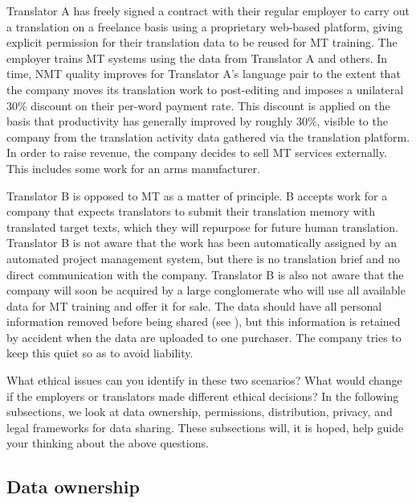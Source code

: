 \documentclass[output=paper]{langscibook}
\begin{document}
Translator A has freely signed a contract with their regular employer to carry out a translation on a freelance basis using a proprietary web-based platform, giving explicit permission for their translation data to be reused for MT training. The employer trains MT systems using the data from Translator A and others. In time, NMT quality improves for Translator A’s language pair to the extent that the company moves its translation work to post-editing and imposes a unilateral 30\% discount on their per-word payment rate. This discount is applied on the basis that productivity has generally improved by roughly 30\%, visible to the company from the translation activity data gathered via the translation platform. In order to raise revenue, the company decides to sell MT services externally. This includes some work for an arms manufacturer.

Translator B is opposed to MT as a matter of principle. B accepts work for a company that expects translators to submit their translation memory with translated target texts, which they will repurpose for future human translation. Translator B is not aware that the work has been automatically assigned by an automated project management system, but there is no translation brief and no direct communication with the company. Translator B is also not aware that the company will soon be acquired by a large conglomerate who will use all available data for MT training and offer it for sale. The data should have all personal information removed before being shared (see ), but this information is retained by accident when the data are uploaded to one purchaser. The company tries to keep this quiet so as to avoid liability.

What ethical issues can you identify in these two scenarios? What would change if the employers or translators made different ethical decisions? In the following subsections, we look at data ownership, permissions, distribution, privacy, and legal frameworks for data sharing. These subsections will, it is hoped, help guide your thinking about the above questions.

\subsection{Data ownership}\label{sec:moorkens:2.2}\largerpage
\end{document}
